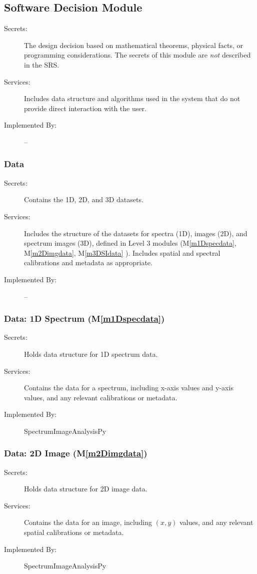 \documentclass[12pt, titlepage]{article}
\newcommand{\mref}[1]{M\ref{#1}}
\newcommand{\progname}{SpectrumImageAnalysisPy}
\begin{document}
\subsection{Software Decision Module}

\begin{description}
\item[Secrets:] The design decision based on mathematical theorems, physical
  facts, or programming considerations. The secrets of this module are
  \emph{not} described in the SRS.
\item[Services:] Includes data structure and algorithms used in the system that
  do not provide direct interaction with the user. 
\item[Implemented By:] --
\end{description}

\subsubsection{Data}
\begin{description}
	\item[Secrets:]Contains the 1D, 2D, and 3D datasets.
	\item[Services:]Includes the structure of the datasets for spectra (1D), images
(2D), and spectrum images (3D), defined in Level 3 modules (\mref{m1Dspecdata},
\mref{m2Dimgdata}, \mref{m3DSIdata} ). Includes spatial and spectral
calibrations and metadata as appropriate.
	\item[Implemented By:] --
\end{description}

\subsubsection{Data: 1D Spectrum (\mref{m1Dspecdata})}
\begin{description}
	\item[Secrets:]Holds data structure for 1D spectrum data.
	\item[Services:]Contains the data for a spectrum, including x-axis values and
y-axis values, and any relevant calibrations or metadata.
	\item[Implemented By:] \progname
\end{description}

\subsubsection{Data: 2D Image (\mref{m2Dimgdata})}
\begin{description}
	\item[Secrets:]Holds data structure for 2D image data.
	\item[Services:]Contains the data for an image, including $(x,y)$ values, and
any relevant spatial calibrations or metadata.
	\item[Implemented By:] \progname
\end{description}
\end{document}
